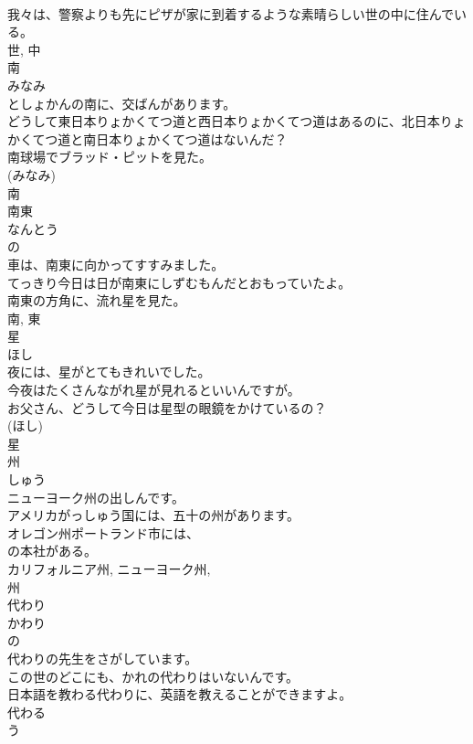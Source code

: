 \documentclass[8pt]{extreport}
\begin{document}
\begin{CJK}{UTF8}{min}
\\	我々は、警察よりも先にピザが家に到着するような素晴らしい世の中に住んでいる。	
\\	世, 中	
\\	南	
\\	みなみ	
\\	としょかんの南に、交ばんがあります。	
\\	どうして東日本りょかくてつ道と西日本りょかくてつ道はあるのに、北日本りょかくてつ道と南日本りょかくてつ道はないんだ？	
\\	南球場でブラッド・ピットを見た。	
\\	(みなみ) 
\\	南	
\\	南東	
\\	なんとう	
\\	の 
\\	車は、南東に向かってすすみました。	
\\	てっきり今日は日が南東にしずむもんだとおもっていたよ。	
\\	南東の方角に、流れ星を見た。	
\\	南, 東	
\\	星	
\\	ほし	
\\	夜には、星がとてもきれいでした。	
\\	今夜はたくさんながれ星が見れるといいんですが。	
\\	お父さん、どうして今日は星型の眼鏡をかけているの？	
\\	(ほし) 
\\	星	
\\	州	
\\	しゅう	
\\	ニューヨーク州の出しんです。	
\\	アメリカがっしゅう国には、五十の州があります。	
\\	オレゴン州ポートランド市には、
\\	の本社がある。	
\\	カリフォルニア州, ニューヨーク州, 
\\	州	
\\	代わり	
\\	かわり	
\\	の 
\\	代わりの先生をさがしています。	
\\	この世のどこにも、かれの代わりはいないんです。	
\\	日本語を教わる代わりに、英語を教えることができますよ。	
\\	代わる 
\\	う 

\end{CJK}
\end{document}

